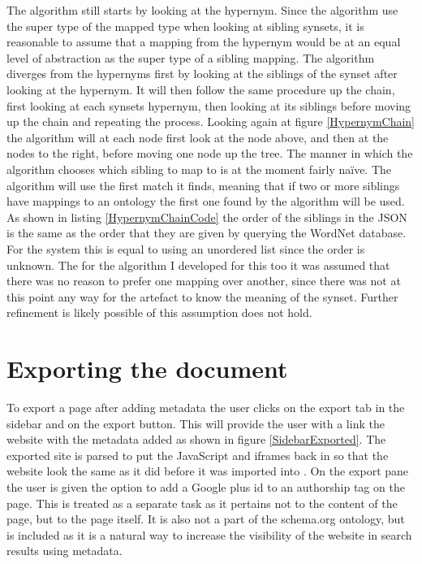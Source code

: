 The algorithm still starts by looking at the hypernym.
Since the algorithm use the super type of the mapped type when looking at sibling synsets,
it is reasonable to assume that a mapping from the hypernym would be at an equal level of abstraction as the
super type of a sibling mapping.
The algorithm diverges from the hypernyms first by looking at the siblings of the synset after looking at the hypernym.
It will then follow the same procedure up the chain, first looking at each synsets hypernym,
then looking at its siblings before moving up the chain and repeating the process.
Looking again at figure \ref{HypernymChain} the algorithm will at each node first look at the node above,
and then at the nodes to the right, before moving one node up the tree.
The manner in which the algorithm chooses which sibling to map to is at the moment fairly naïve.
The algorithm will use the first match it finds,
meaning that if two or more siblings have mappings to an ontology the first one found by the algorithm will be used.
As shown in listing \ref{HypernymChainCode} the order of the siblings in the JSON is the same as the order that they
are given by querying the WordNet database.
For the system this is equal to using an unordered list since the order is unknown.
The for the algorithm I developed for this too it was assumed that there was no reason to prefer one mapping over another,
since there was not at this point any way for the artefact to know the meaning of the synset.
Further refinement is likely possible of this assumption does not hold.

\section{Exporting the document}
To export a page after adding metadata the user clicks on the export tab in the sidebar and on the export button.
This will provide the user with a link the website with the metadata added as shown in figure \ref{SidebarExported}.
The exported site is parsed to put the JavaScript and iframes back in so that the website look the same as it did
before it was imported into \theartefact.
On the export pane the user is given the option to add a Google plus id to an authorship tag on the page.
This is treated as a separate task as it pertains not to the content of the page, but to the page itself.
It is also not a part of the schema.org ontology, but is included as it is a natural way to increase the visibility of
the website in search results using metadata.


